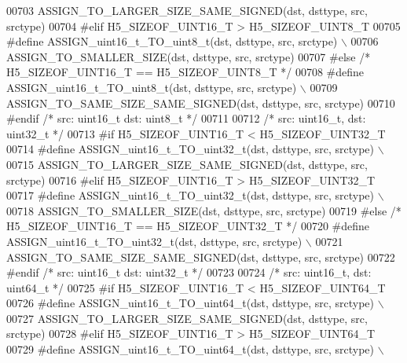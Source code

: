 \begin{DoxyCode}
00703 \textcolor{preprocessor}{        ASSIGN\_TO\_LARGER\_SIZE\_SAME\_SIGNED(dst, dsttype, src, srctype)}
00704 \textcolor{preprocessor}{#elif H5\_SIZEOF\_UINT16\_T > H5\_SIZEOF\_UINT8\_T}
00705 \textcolor{preprocessor}{    #define ASSIGN\_uint16\_t\_TO\_uint8\_t(dst, dsttype, src, srctype) \(\backslash\)}
00706 \textcolor{preprocessor}{        ASSIGN\_TO\_SMALLER\_SIZE(dst, dsttype, src, srctype)}
00707 \textcolor{preprocessor}{#else }\textcolor{comment}{/* H5\_SIZEOF\_UINT16\_T == H5\_SIZEOF\_UINT8\_T */}\textcolor{preprocessor}{}
00708 \textcolor{preprocessor}{    #define ASSIGN\_uint16\_t\_TO\_uint8\_t(dst, dsttype, src, srctype) \(\backslash\)}
00709 \textcolor{preprocessor}{        ASSIGN\_TO\_SAME\_SIZE\_SAME\_SIGNED(dst, dsttype, src, srctype)}
00710 \textcolor{preprocessor}{#endif }\textcolor{comment}{/* src: uint16\_t dst: uint8\_t */}\textcolor{preprocessor}{}
00711 
00712 \textcolor{comment}{/* src: uint16\_t, dst: uint32\_t */}
00713 \textcolor{preprocessor}{#if H5\_SIZEOF\_UINT16\_T < H5\_SIZEOF\_UINT32\_T}
00714 \textcolor{preprocessor}{    #define ASSIGN\_uint16\_t\_TO\_uint32\_t(dst, dsttype, src, srctype) \(\backslash\)}
00715 \textcolor{preprocessor}{        ASSIGN\_TO\_LARGER\_SIZE\_SAME\_SIGNED(dst, dsttype, src, srctype)}
00716 \textcolor{preprocessor}{#elif H5\_SIZEOF\_UINT16\_T > H5\_SIZEOF\_UINT32\_T}
00717 \textcolor{preprocessor}{    #define ASSIGN\_uint16\_t\_TO\_uint32\_t(dst, dsttype, src, srctype) \(\backslash\)}
00718 \textcolor{preprocessor}{        ASSIGN\_TO\_SMALLER\_SIZE(dst, dsttype, src, srctype)}
00719 \textcolor{preprocessor}{#else }\textcolor{comment}{/* H5\_SIZEOF\_UINT16\_T == H5\_SIZEOF\_UINT32\_T */}\textcolor{preprocessor}{}
00720 \textcolor{preprocessor}{    #define ASSIGN\_uint16\_t\_TO\_uint32\_t(dst, dsttype, src, srctype) \(\backslash\)}
00721 \textcolor{preprocessor}{        ASSIGN\_TO\_SAME\_SIZE\_SAME\_SIGNED(dst, dsttype, src, srctype)}
00722 \textcolor{preprocessor}{#endif }\textcolor{comment}{/* src: uint16\_t dst: uint32\_t */}\textcolor{preprocessor}{}
00723 
00724 \textcolor{comment}{/* src: uint16\_t, dst: uint64\_t */}
00725 \textcolor{preprocessor}{#if H5\_SIZEOF\_UINT16\_T < H5\_SIZEOF\_UINT64\_T}
00726 \textcolor{preprocessor}{    #define ASSIGN\_uint16\_t\_TO\_uint64\_t(dst, dsttype, src, srctype) \(\backslash\)}
00727 \textcolor{preprocessor}{        ASSIGN\_TO\_LARGER\_SIZE\_SAME\_SIGNED(dst, dsttype, src, srctype)}
00728 \textcolor{preprocessor}{#elif H5\_SIZEOF\_UINT16\_T > H5\_SIZEOF\_UINT64\_T}
00729 \textcolor{preprocessor}{    #define ASSIGN\_uint16\_t\_TO\_uint64\_t(dst, dsttype, src, srctype) \(\backslash\)}

\end{DoxyCode}
